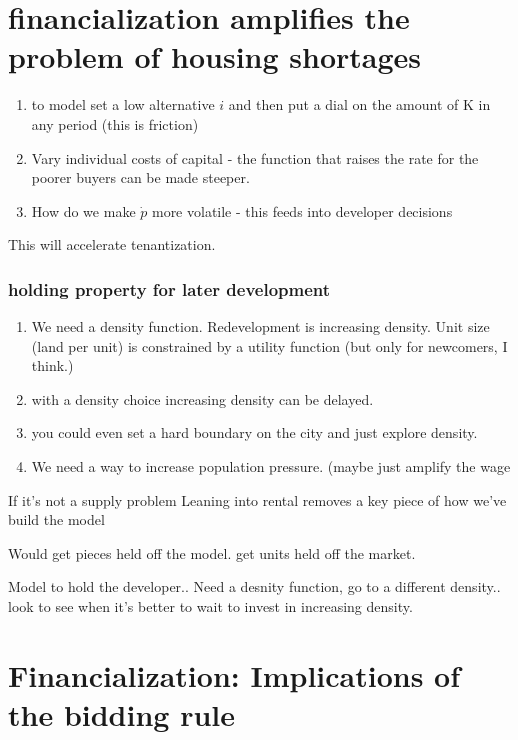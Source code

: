 \section{financialization amplifies the problem of housing shortages }

\begin{enumerate}
    \item to model set a low alternative $i$ and then put a dial on the amount of K in any period (this is friction)
    \item Vary individual costs of capital - the function that raises the rate for the poorer buyers can be made steeper.
    \item How do we make $\dot p$ more volatile - this feeds into developer decisions
\end{enumerate}

This will accelerate tenantization.

\subsubsection{holding property for later development}

\begin{enumerate}
    \item We need a density function. Redevelopment is increasing density. Unit size (land per unit) is constrained by a utility function  (but only for newcomers, I think.) 
    \item with a density choice increasing density can be delayed.
    \item you could even set a hard boundary on the city and just explore density. 
    \item We need a way to increase population pressure. (maybe just amplify the wage
\end{enumerate}
If it's not a supply problem
Leaning into rental removes a key piece of how we've build the model


Would get pieces held off the model.
get units held off the market.


Model to hold the developer.. 
Need a desnity function, go to a different density..
look to see when it's better to wait to invest in increasing density.

\section{Financialization: Implications of the bidding rule}

